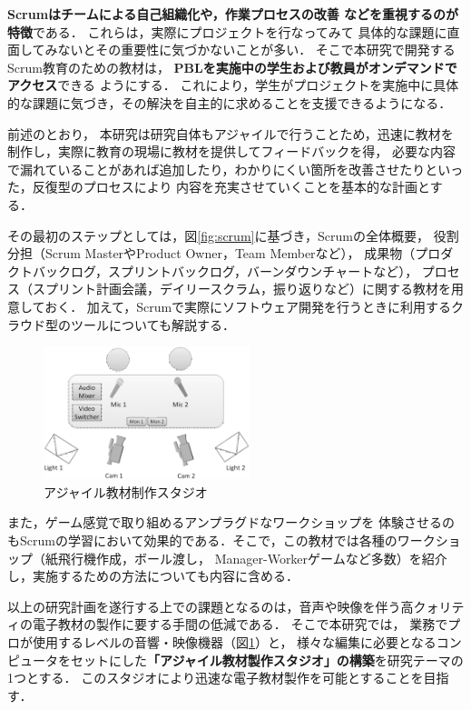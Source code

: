 \documentclass[11pt,a4paper,twoside]{jarticle}
\newcommand{\研究種別}{C}	%
\newcommand{\研究課題名}{コ・クリエイティブなソフトウェア開発者を育成するPBL型教育}
\newcommand{\研究機関名}{産業技術大学院大学}
\newcommand{\研究代表者氏名}{中鉢　欣秀}
\newcommand{\研究代表者氏名ふりがな}{ちゅうばち　よしひで}
\newcommand{\本応募effort}{\KLEffort{18}}	%
\newcommand{\研究期間の最終元号年度}{27}	%
\begin{document}
{	{\bf Scrumはチームによる自己組織化や，作業プロセスの改善
	などを重視するのが特徴}である．
	これらは，実際にプロジェクトを行なってみて
	具体的な課題に直面してみないとその重要性に気づかないことが多い．
	そこで本研究で開発するScrum教育のための教材は，
	{\bf PBLを実施中の学生および教員がオンデマンドでアクセス}できる
	ようにする．
	これにより，学生がプロジェクトを実施中に具体的な課題に気づき，その解決を自主的に求めることを支援できるようになる．
	
	前述のとおり，
	本研究は研究自体もアジャイルで行うことため，迅速に教材を制作し，実際に教育の現場に教材を提供してフィードバックを得，
	必要な内容で漏れていることがあれば追加したり，わかりにくい箇所を改善させたりといった，反復型のプロセスにより
	内容を充実させていくことを基本的な計画とする．
	
	その最初のステップとしては，図\ref{fig:scrum}に基づき，Scrumの全体概要，
	役割分担（Scrum MasterやProduct Owner，Team Memberなど），
	成果物（プロダクトバックログ，スプリントバックログ，バーンダウンチャートなど），
	プロセス（スプリント計画会議，デイリースクラム，振り返りなど）に関する教材を用意しておく．
	加えて，Scrumで実際にソフトウェア開発を行うときに利用するクラウド型のツールについても解説する．

         \begin{figure}
			\vspace{-1cm}
         	\begin{center}
		         \includegraphics[width=6cm]{figs/studio.eps}
		         \caption{アジャイル教材制作スタジオ}
		         \label{fig:studio}
	         \end{center}
         \end{figure}

	また，ゲーム感覚で取り組めるアンプラグドなワークショップを
	体験させるのもScrumの学習において効果的である．そこで，この教材では各種のワークショップ（紙飛行機作成，ボール渡し，
	Manager-Workerゲームなど多数）を紹介し，実施するための方法についても内容に含める．

	以上の研究計画を遂行する上での課題となるのは，音声や映像を伴う高クォリティの電子教材の製作に要する手間の低減である．
	そこで本研究では，
	業務でプロが使用するレベルの音響・映像機器（図\ref{fig:studio}）と，
	様々な編集に必要となるコンピュータをセットにした{\bf 「アジャイル教材製作スタジオ」の構築}を研究テーマの1つとする．
	このスタジオにより迅速な電子教材製作を可能とすることを目指す．

}
\end{document}
